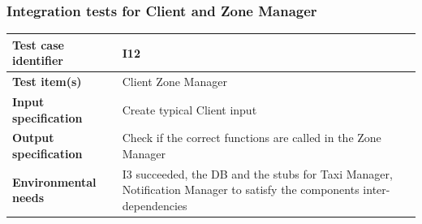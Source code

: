 \documentclass[a4paper,11pt]{report} %
\begin{document}
		\subsubsection{Integration tests for Client and Zone Manager} \label{sec:3.1.9}
			\begin{minipage}{\linewidth}
			\end{minipage}		
		\begin{center}
			\renewcommand{\arraystretch}{1.2}
			\setlength{\tabcolsep}{24pt}
			\begin{tabular}{ l  p{9cm}}\hline
				\textbf{Test case identifier} & I12\\\hline
				\textbf{Test item(s)} & Client \textrightarrow Zone Manager\\\hline
				\textbf{Input specification} & Create typical Client input \\\hline
				\textbf{Output specification} & Check if the correct functions are called in the Zone Manager\\\hline
				\textbf{Environmental needs} &  I3 succeeded, the DB and the stubs for Taxi Manager, Notification Manager to satisfy the components inter-dependencies\\\hline
			\end{tabular}
		\end{center}	

		\pagebreak
\end{document}
